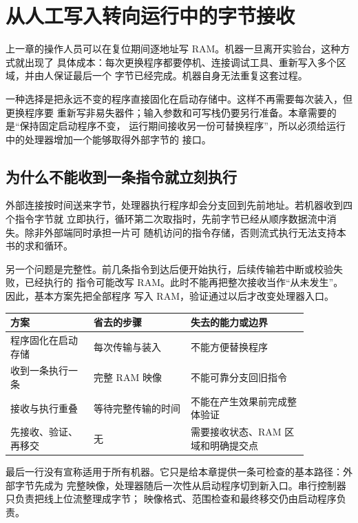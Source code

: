 \section{从人工写入转向运行中的字节接收}

上一章的操作人员可以在复位期间逐地址写 RAM。机器一旦离开实验台，这种方式就出现了
具体成本：每次更换程序都要停机、连接调试工具、重新写入多个区域，并由人保证最后一个
字节已经完成。机器自身无法重复这套过程。

一种选择是把永远不变的程序直接固化在启动存储中。这样不再需要每次装入，但更换程序要
重新写非易失器件；输入参数和可写栈仍要另行准备。本章需要的是“保持固定启动程序不变，
运行期间接收另一份可替换程序”，所以必须给运行中的处理器增加一个能够取得外部字节的
接口。

\subsection{为什么不能收到一条指令就立刻执行}

外部连接按时间送来字节，处理器执行程序却会分支回到先前地址。若机器收到四个指令字节就
立即执行，循环第二次取指时，先前字节已经从顺序数据流中消失。除非外部端同时承担一片可
随机访问的指令存储，否则流式执行无法支持本书的求和循环。

另一个问题是完整性。前几条指令到达后便开始执行，后续传输若中断或校验失败，已经执行的
指令可能改写 RAM。此时不能再把整次接收当作“从未发生”。因此，基本方案先把全部程序
写入 RAM，验证通过以后才改变处理器入口。

\begin{longtable}{|L{0.24\linewidth}|L{0.28\linewidth}|L{0.34\linewidth}|}
\hline
{}
方案 & 省去的步骤 & 失去的能力或边界 \\ \hline
程序固化在启动存储 & 每次传输与装入 & 不能方便替换程序 \\ \hline
收到一条执行一条 & 完整 RAM 映像 & 不能可靠分支回旧指令 \\ \hline
接收与执行重叠 & 等待完整传输的时间 & 不能在产生效果前完成整体验证 \\ \hline
先接收、验证、再移交 & 无 & 需要接收状态、RAM 区域和明确提交点 \\ \hline
\end{longtable}

最后一行没有宣称适用于所有机器。它只是给本章提供一条可检查的基本路径：外部字节先成为
完整映像，处理器随后一次性从启动程序切到新入口。串行控制器只负责把线上位流整理成字节；
映像格式、范围检查和最终移交仍由启动程序负责。

